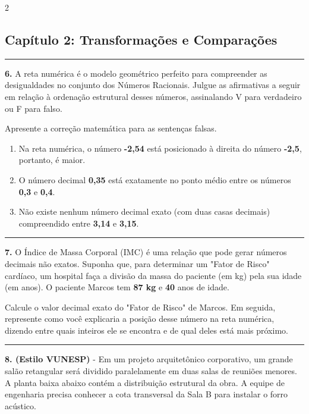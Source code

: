 \documentclass[twoside, 10pt, a4paper]{article}
\newlength{\espacoPosTitulo}
\newlength{\espacoPreQuestao}
\newlength{\espacoQuestao}
\begin{document}
\begin{multicols*}{2}
\subsection*{Capítulo 2: Transformações e Comparações}
\vspace{-0.2cm}\noindent\rule{\linewidth}{1.5pt} 
\par\vspace{\espacoPosTitulo}
\textbf{6.} A reta numérica é o modelo geométrico perfeito para compreender as desigualdades no conjunto dos Números Racionais. Julgue as afirmativas a seguir em relação à ordenação estrutural desses números, assinalando V para verdadeiro ou F para falso.

Apresente a correção matemática para as sentenças falsas.
\begin{enumerate}[label=\Roman*.]
    \item Na reta numérica, o número \textbf{-2,54} está posicionado à direita do número \textbf{-2,5}, portanto, é maior.
    \item O número decimal \textbf{0,35} está exatamente no ponto médio entre os números \textbf{0,3} e \textbf{0,4}.
    \item Não existe nenhum número decimal exato (com duas casas decimais) compreendido entre \textbf{3,14} e \textbf{3,15}.
\end{enumerate}
\par\vspace{\espacoQuestao}

\noindent\textcolor{CorLinha}{\rule{\linewidth}{0.5pt}} 
\par\vspace{\espacoPreQuestao}
\textbf{7.} O Índice de Massa Corporal (IMC) é uma relação que pode gerar números decimais não exatos. Suponha que, para determinar um "Fator de Risco" cardíaco, um hospital faça a divisão da massa do paciente (em kg) pela sua idade (em anos). O paciente Marcos tem \textbf{87 kg} e \textbf{40} anos de idade.

Calcule o valor decimal exato do "Fator de Risco" de Marcos. Em seguida, represente como você explicaria a posição desse número na reta numérica, dizendo entre quais inteiros ele se encontra e de qual deles está mais próximo.
\par\vspace{\espacoQuestao}

\noindent\textcolor{CorLinha}{\rule{\linewidth}{0.5pt}} 
\par\vspace{\espacoPreQuestao}
\textbf{8. (Estilo VUNESP)} - Em um projeto arquitetônico corporativo, um grande salão retangular será dividido paralelamente em duas salas de reuniões menores. A planta baixa abaixo contém a distribuição estrutural da obra. A equipe de engenharia precisa conhecer a cota transversal da Sala B para instalar o forro acústico.


\end{multicols*}
\end{document}
